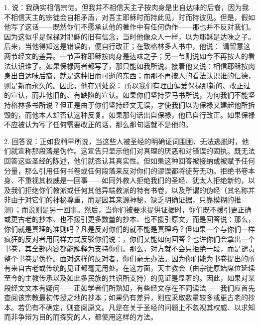 1. 说：我确实相信宗徒。但我并不相信天主子按肉身是出自达味的后裔，因为我不相信天主的宗徒会自相矛盾，对吾主耶稣时而持此见，时而持彼见。但是，假如他写了这话——既然你们不愿承认他的著作中有任何伪作——那也并不反对我们。因为这似乎是保禄对耶稣的旧有信念，当时他像众人一样，以为耶稣是达味之子。后来，当他得知这是错误的，便自行改正；在致格林多人书中，他说： 请留意这两节经文的差异。一节声称耶稣按肉身是达味之子；另一节则说如今不再按人的看法认识谁了。如果保禄两者都写了，那只能如我所说。接着他又说：相信耶稣按肉身出自达味后裔，就是这种旧而可逝的东西；而那不再按人的看法认识谁的信德，则是新而永久的。因此，他在别处说： 所以我们有理由偏爱保禄那新的、改正过的宣认，而非他旧的、有缺陷的宣认。如果你们坚持罗马书所说，为何我们不能坚持格林多书所说？但正是由于你们坚持经文无误，才使我们以为保禄又建起他所拆毁的，而他本人却否认这种反复。如果那句话出自保禄，他已自行改正。如果保禄不应被认为写了任何需要改正的话，那么那句话就不是他的。\par

2. 回答说：正如我稍早所说，当这些人被圣经的明确证词围困、无法逃脱时，他们就宣称那段落是伪作。这宣告只显示他们对真理的厌恶和对错误的固执。既无法回答这些圣经的陈述，他们就否认其真实性。但如果这种回答被接纳或被赋予任何分量，那么引用任何书卷或任何段落来反对你们的谬误都将徒劳无功。拒绝书卷本身、不重视其权威是一回事——如同外教人拒绝我们的圣经、犹太人拒绝新约，以及我们拒绝你们教派或任何其他异端教派的特有书卷，以及所谓的伪经（其名称并非由于对它们的神秘尊重，而是因其来源神秘，缺乏明确证据，只靠模糊的推测）；而说则是另一回事。然后，当你们被要求提供证据时，你们既不援引更正确或更古老的抄本、也不援引更多数量的抄本、也不援引原文，而是回答说：那么，你们就是真理的准则吗？凡是反对你们的就不能是真理吗？但如果一个与你们一样疯狂的反对者用同样方式反驳你们说：，你们又能如何回答？也许你们会拿出一个书卷，其全部内容都能解释为支持你们。那么，对方就不会只拒绝一段，而是谴责整个书卷是伪作。面对这样的反对者，你们毫无办法。因为你们能为书卷提出的所有来自古老或传统的见证都毫无用处。在这方面，天主教会（由宗徒原始席位延续至今的主教传承以及如此多民族的共识所支持）的见证是显著的。因此，如果对某段经文文本有疑问——正如学者们所熟知，有些经文存在不同读法——我们应首先查阅该宗教最初传授之地的抄本；如果仍有差异，则应采取数量较多或更古老的抄本。若仍有不确定，则查阅原文。凡是在关于圣经的问题上不忽视其权威、以求知而非争辩为目的而探究的人，都使用这样的方法。\par

